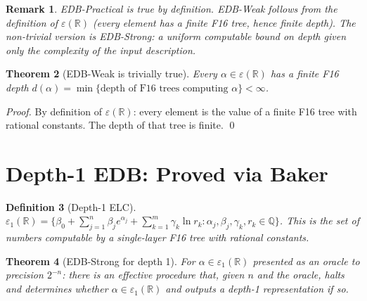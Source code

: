 \documentclass[11pt]{article}
\newtheorem{theorem}{Theorem}
\newtheorem{definition}[theorem]{Definition}
\newtheorem{remark}[theorem]{Remark}
\begin{document}
\begin{remark}
EDB-Practical is true by definition.
EDB-Weak follows from the definition of $\varepsilon(\mathbb{R})$
(every element has a finite F16 tree, hence finite depth).
The non-trivial version is EDB-Strong: a \emph{uniform computable bound}
on depth given only the complexity of the input description.
\end{remark}

\begin{theorem}[EDB-Weak is trivially true]
\label{thm:edb_weak}
Every $\alpha \in \varepsilon(\mathbb{R})$ has a finite F16 depth
$d(\alpha) = \min\{\text{depth of F16 trees computing } \alpha\} < \infty$.
\end{theorem}

\begin{proof}
By definition of $\varepsilon(\mathbb{R})$: every element is the value of a
finite F16 tree with rational constants. The depth of that tree is finite. \qed
\end{proof}

\section{Depth-1 EDB: Proved via Baker}

\begin{definition}[Depth-1 ELC]
$\varepsilon_1(\mathbb{R}) = \{ \beta_0 + \sum_{j=1}^n \beta_j e^{\alpha_j} + \sum_{k=1}^m \gamma_k \ln r_k
: \alpha_j, \beta_j, \gamma_k, r_k \in \mathbb{Q} \}$.
This is the set of numbers computable by a single-layer F16 tree with rational constants.
\end{definition}

\begin{theorem}[EDB-Strong for depth 1]
\label{thm:edb_depth1}
For $\alpha \in \varepsilon_1(\mathbb{R})$ presented as an oracle to precision $2^{-n}$:
there is an effective procedure that, given $n$ and the oracle, halts and determines
whether $\alpha \in \varepsilon_1(\mathbb{R})$ and outputs a depth-1 representation if so.
\end{theorem}
\end{document}
